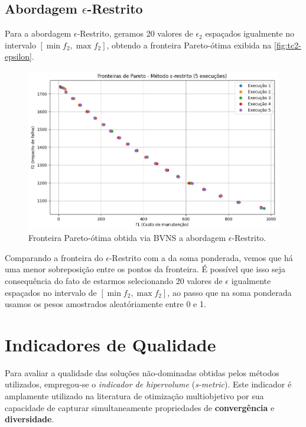 \documentclass[
	12pt,				%
	oneside,			%
	a4paper,			%
	chapter=TITLE,
	sumario=tradicional,
	english,			%
	brazil				%
]{abntex2}
\begin{document}
\section{Abordagem $\epsilon$-Restrito}

Para a abordagem $\epsilon$-Restrito, geramos 20 valores de 
$\epsilon_2$ espaçados igualmente no intervalo $\left[ \min f_2 , \max f_2 \right]$,
obtendo a fronteira Pareto-ótima exibida na \autoref{fig:tc2-epsilon}.

\begin{figure}[h!]
	\caption{\label{fig:tc2-epsilon}Fronteira Pareto-ótima obtida via BVNS a 
	abordagem $\epsilon$-Restrito.}
	\begin{center}
    \includegraphics[width=\textwidth,trim=1 1 1 1,clip]{tc2-epsilon.png}
	\end{center}
\end{figure}

Comparando a fronteira do $\epsilon$-Restrito com a da soma ponderada, vemos 
que há uma menor sobreposição entre os pontos da fronteira. É possível que isso 
seja consequência do fato de estarmos selecionando 20 valores de $\epsilon$ igualmente 
espaçados no intervalo de $\left[ \min f_2 , \max f_2 \right]$, ao passo que na soma ponderada 
usamos os pesos amostrados aleatóriamente entre 0 e 1.


\chapter{Indicadores de Qualidade}\label{cap:analise} 

Para avaliar a qualidade das soluções não-dominadas obtidas pelos métodos utilizados, empregou-se o
\textit{indicador de hipervolume} (\textit{s-metric}). Este indicador é amplamente utilizado na literatura de otimização multiobjetivo
por sua capacidade de capturar simultaneamente propriedades de \textbf{convergência} e \textbf{diversidade}.
\end{document}
